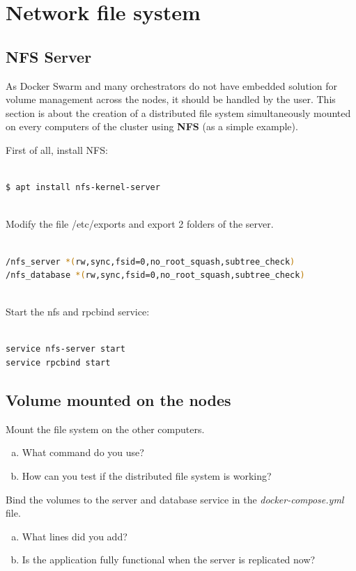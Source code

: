 \documentclass[a4paper,11pt]{exam}
\begin{document}
\clearpage

\section{Network file system}

\subsection{NFS Server}

As Docker Swarm and many orchestrators do not have embedded solution for volume management across the nodes, it should be handled by the user.
This section is about the creation of a distributed file system simultaneously mounted on every computers of the cluster using \textbf{NFS} (as a simple example).

First of all, install NFS:

\begin{lstlisting}[frame=single,language={sh}]  % Start your code-block

$ apt install nfs-kernel-server
			
\end{lstlisting}

Modify the file /etc/exports and export 2 folders of the server.

\begin{lstlisting}[frame=single,language={sh}]  % Start your code-block

/nfs_server *(rw,sync,fsid=0,no_root_squash,subtree_check)
/nfs_database *(rw,sync,fsid=0,no_root_squash,subtree_check)	
			
\end{lstlisting}

Start the nfs and rpcbind service: 

\begin{lstlisting}[frame=single,language={sh}]  % Start your code-block

service nfs-server start	
service rpcbind start			

\end{lstlisting}

\subsection{Volume mounted on the nodes}

\begin{questions}
	\question Mount the file system on the other computers.
	\begin{enumerate}[(a)]
		\item What command do you use?
		\item How can you test if the distributed file system is working?
	\end{enumerate}
	\question Bind the volumes to the server and database service in the \textit{docker-compose.yml} file.
	\begin{enumerate}[(a)]
		\item What lines did you add?
		\item Is the application fully functional when the server is replicated now?
	\end{enumerate}
\end{questions}
\end{document}
